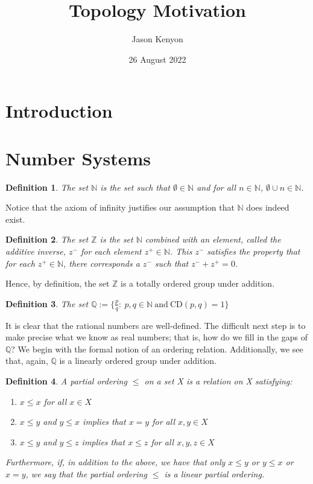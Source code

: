 \documentclass{article}
\title{Topology Motivation}
\author{Jason Kenyon}
\date{26 August 2022}
\newtheorem{defn}{Definition}[section]
\numberwithin{equation}{section}
\begin{document}
    \maketitle
    \section{Introduction}
    \section{Number Systems}
    \begin{defn}
        The set $\mathbb{N}$ is the set such that $\emptyset \in \mathbb{N}$
        and for all $n \in \mathbb{N}$, $\emptyset \cup n \in \mathbb{N}$.
    \end{defn}
    Notice that the axiom of infinity justifies our assumption that $\mathbb{N}$ does indeed exist.
    \begin{defn}
        The set $\mathbb{Z}$ is the set $\mathbb{N}$ combined with an element, called the additive inverse, $z^{-}$ for each element $z^{+} \in \mathbb{N}$. This $z^{-}$ satisfies the property that
        for each $z^{+} \in \mathbb{N}$, there corresponds a $z^{-}$ such that $z^{-}+z^{+}=0$.
    \end{defn}
    Hence, by definition, the set $\mathbb{Z}$ is a totally ordered group under addition. 
    \begin{defn}
        The set $\mathbb{Q}:=\{\frac{p}{q}: \ p,q \in \mathbb{N} \ \mathrm{and} \ \mathrm{CD}(p,q)=1 \}$
    \end{defn}
    It is clear that the rational numbers are well-defined. The difficult next step is to 
    make precise what we know as real numbers; that is, how do we fill in the gaps of $\mathbb{Q}$?
    We begin with the formal notion of an ordering relation. Additionally, we see that, again, $\mathbb{Q}$ is a linearly ordered group under addition.
    \begin{defn}
        A partial ordering $\leq$ on a set X is a relation on X satisfying:
        \begin{enumerate}
            \item $x \leq x$ for all $x \in X$
            \item $x \leq y$ and $y \leq x$ implies that $x=y$ for all $x,y \in X$
            \item $x \leq y$ and $y \leq z$ implies that $x \leq z$ for all $x, y, z \in X$
        \end{enumerate}
        Furthermore, if, in addition to the above, we have that only $x \leq y$ or  $y \leq x$ or $x=y$,
        we say that the partial ordering $\leq$ is a linear partial ordering.
    \end{defn}
\end{document}
